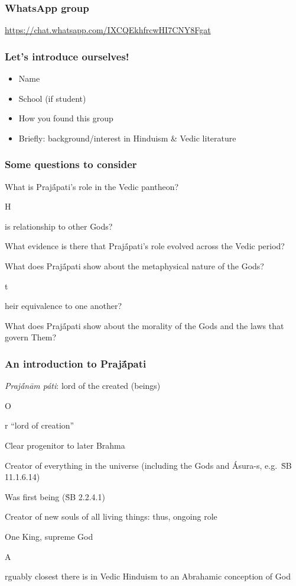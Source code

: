 \documentclass[pdf]{beamer}
\newcommand{\Subitem}[1]{{\setlength\itemindent{12pt} \item[-] #1}}
\begin{document}
\begin{frame} \frametitle{WhatsApp group}
\begin{center}
	\href{https://chat.whatsapp.com/IXCQEkhfrcwHI7CNY8Fgat}{https://chat.whatsapp.com/IXCQEkhfrcwHI7CNY8Fgat}
\end{center}
\end{frame}

\begin{frame} \frametitle{Let's introduce ourselves!}
\begin{itemize}
	\item Name
	\item School (if student)
	\item How you found this group
	\item Briefly: background/interest in Hinduism \& Vedic literature
\end{itemize}
\end{frame}

\begin{frame}[label=questions] \frametitle{Some questions to consider}
\begin{itemize}
	\item What is Prajā́pati's role in the Vedic pantheon?
	\Subitem His relationship to other Gods?
	\item What evidence is there that Prajā́pati's role evolved across the Vedic period?
	\item What does Prajā́pati show about the metaphysical nature of the Gods?
	\Subitem their equivalence to one another?
	\item What does Prajā́pati show about the morality of the Gods and the laws that govern Them?
\end{itemize}
\end{frame}

\begin{frame} \frametitle{An introduction to Prajā́pati}
\begin{itemize}
	\item \textit{Prajā́nām páti}: lord of the created (beings)
	\Subitem Or ``lord of creation''
	\item Clear progenitor to later Brahma
	\item Creator of everything in the universe (including the Gods and Ásura-s, e.g.~ṠB 11.1.6.14)
	\item Was first being (ṠB 2.2.4.1)
	\item Creator of new souls of all living things: thus, ongoing role
	\item One King, supreme God
	\Subitem Arguably closest there is in Vedic Hinduism to an Abrahamic conception of God
\end{itemize}
\end{frame}
\end{document}
